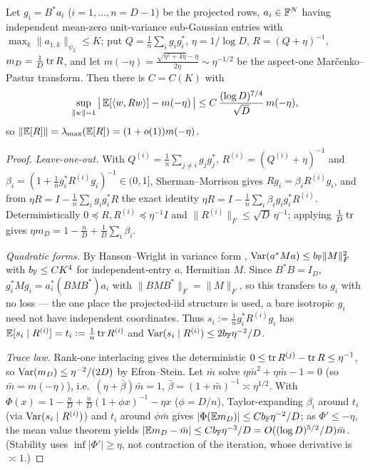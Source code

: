 \begin{lemma}\label{appB:offsupport}
Let $g_i=B^*a_i$ ($i=1,\dots,n=D-1$) be the projected rows, $a_i\in\mathbb{F}^N$ having independent mean-zero
unit-variance sub-Gaussian entries with $\max_k\|a_{1,k}\|_{\psi_2}\le K$; put
$Q=\tfrac1n\sum_i g_ig_i^*$, $\eta=1/\log D$, $R=(Q+\eta)^{-1}$, $m_D=\tfrac1D\operatorname{tr} R$, and let
$m(-\eta)=\tfrac{\sqrt{\eta^2+4\eta}-\eta}{2\eta}\sim\eta^{-1/2}$ be the aspect-one
Mar\v{c}enko--Pastur transform.  Then there is $C=C(K)$ with
\[
  \sup_{\|w\|=1}\big|\,\mathbb{E}[\langle w,Rw\rangle]-m(-\eta)\,\big|\le C\,\frac{(\log D)^{7/4}}{\sqrt D}\,m(-\eta),
\]
so $\|\mathbb{E}[R]\|=\lambda_{\max}(\mathbb{E}[R])=(1+o(1))m(-\eta)$.
\end{lemma}

\begin{proof}
\emph{Leave-one-out.}  With $Q^{(i)}=\tfrac1n\sum_{j\ne i}g_jg_j^*$, $R^{(i)}=(Q^{(i)}+\eta)^{-1}$ and
$\beta_i=(1+\tfrac1n g_i^*R^{(i)}g_i)^{-1}\in(0,1]$, Sherman--Morrison gives $Rg_i=\beta_iR^{(i)}g_i$,
and from $\eta R=I-\tfrac1n\sum_i g_ig_i^*R$ the exact identity
$\eta R=I-\tfrac1n\sum_i\beta_i g_ig_i^*R^{(i)}$.  Deterministically $0\preceq R,R^{(i)}\preceq\eta^{-1}I$
and $\|R^{(i)}\|_F\le\sqrt D\,\eta^{-1}$; applying $\tfrac1D\operatorname{tr}$ gives
$\eta m_D=1-\tfrac nD+\tfrac1D\sum_i\beta_i$.

\emph{Quadratic forms.}  By Hanson--Wright in variance form \cite{RudelsonVershynin2013},
$\operatorname{Var}(a^*Ma)\le b_{\mathbb{F}}\|M\|_F^2$ with $b_{\mathbb{F}}\le CK^4$ for independent-entry $a$, Hermitian $M$.  Since
$B^*B=I_D$, $g_i^*Mg_i=a_i^*(BMB^*)a_i$ with $\|BMB^*\|_F=\|M\|_F$, so this transfers to $g_i$ with no
loss --- the one place the projected-iid structure is used, a bare isotropic $g_i$ need not have
independent coordinates.  Thus $s_i:=\tfrac1n g_i^*R^{(i)}g_i$ has $\mathbb{E}[s_i\mid R^{(i)}]=t_i:=\tfrac1n\operatorname{tr} R^{(i)}$
and $\operatorname{Var}(s_i\mid R^{(i)})\le2b_{\mathbb{F}}\eta^{-2}/D$.

\emph{Trace law.}  Rank-one interlacing gives the deterministic $0\le\operatorname{tr} R^{(j)}-\operatorname{tr} R\le\eta^{-1}$,
so $\operatorname{Var}(m_D)\le\eta^{-2}/(2D)$ by Efron--Stein.  Let $\bar m$ solve $\eta\bar m^2+\eta\bar m-1=0$
(so $\bar m=m(-\eta)$), i.e.\ $(\eta+\bar\beta)\bar m=1$, $\bar\beta=(1+\bar m)^{-1}\asymp\eta^{1/2}$.
With $\Phi(x)=1-\tfrac nD+\tfrac nD(1+\phi x)^{-1}-\eta x$ ($\phi=D/n$), Taylor-expanding $\beta_i$
around $t_i$ (via $\operatorname{Var}(s_i\mid R^{(i)})$) and $t_i$ around $\phi\bar m$ gives
$|\Phi(\mathbb{E} m_D)|\le Cb_{\mathbb{F}}\eta^{-2}/D$; as $\Phi'\le-\eta$, the mean value theorem yields
$|\mathbb{E} m_D-\bar m|\le Cb_{\mathbb{F}}\eta^{-3}/D=O((\log D)^{5/2}/D)\bar m$.  (Stability uses $\inf|\Phi'|\ge\eta$,
not contraction of the iteration, whose derivative is $\asymp1$.)


\end{proof}
